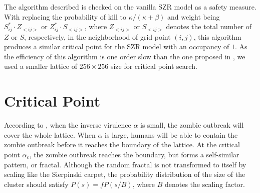 \documentclass[11pt]{article}
\newcommand{\warn}{\textcolor{red}}
\begin{document}
The algorithm described is checked on the vanilla SZR model as a safety measure. With replacing the probability of kill to $\kappa/(\kappa+\beta)$ and weight being ${S_{ij}^*\cdot Z_{<ij>}}$ or ${Z_{ij}^*\cdot S_{<ij>}}$, where $Z_{<ij>}$ or $S_{<ij>}$ denotes the total number of $Z$ or $S$, respectively, in the neighborhood of grid point $(i,j)$, this algorithm produces a similar critical point for the SZR model with an occupancy of $1$. As the efficiency of this algorithm is one order slow than the one proposed in \cite{Zombies}, we used a smaller lattice of $256\times 256$ size for critical point search.

\section{Critical Point}
According to \cite{Zombies}, when the inverse virulence $\alpha$ is small, the zombie outbreak will cover the whole lattice. When $\alpha$ is large, humans will be able to contain the zombie outbreak before it reaches the boundary of the lattice. At the critical point $\alpha_{c}$, the zombie outbreak reaches the boundary, but forms a self-similar pattern, or fractal. Although the random fractal is not transformed to itself by scaling like the Sierpinski carpet, the probability distribution of the size of the cluster should satisfy $P(s) = f P(s/B)$, where $B$ denotes the scaling factor.\\
\end{document}
